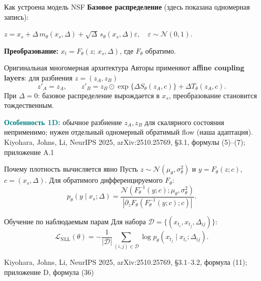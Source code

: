 \documentclass[10pt,aspectratio=169]{beamer}
\newcommand{\nsfsrc}[1]{\vfill{\tiny\color{graytext}Kiyohara, Johns, Li, NeurIPS 2025, arXiv:2510.25769, #1}}
\begin{document}
\begin{frame}{Как устроена модель NSF}
\vspace{0.06cm}
\textbf{Базовое распределение} (здесь показана одномерная запись):
\begin{center}
$\displaystyle z=x_s+\Delta\,m_\theta(x_s,\Delta)
+\sqrt{\Delta}\,s_\theta(x_s,\Delta)\varepsilon,
\quad\varepsilon\sim\mathcal N(0,1).$
\end{center}
\vspace{0.08cm}
\textbf{Преобразование:} $\displaystyle x_t=F_\theta(z;\,x_s,\Delta)$, где $F_\theta$ обратимо.
\vspace{0.12cm}
\begin{block}{Оригинальная многомерная архитектура}
Авторы применяют \textbf{affine coupling layers}: для разбиения $z=(z_A,z_B)$
\[
 z'_A=z_A,\qquad
 z'_B=z_B\odot\exp\{\Delta S_\theta(z_A,c)\}+\Delta T_\theta(z_A,c).
\]
При $\Delta=0$: базовое распределение вырождается в $x_s$, преобразование становится тождественным.
\end{block}
\vspace{0.01cm}
\small\textcolor{teal}{\bfseries Особенность 1D:} обычное разбиение $z_A,z_B$ для скалярного состояния неприменимо; нужен отдельный одномерный обратимый flow (наша адаптация).
\nsfsrc{\S 3.1, формулы (5)--(7); приложение A.1}
\end{frame}

\begin{frame}{Почему плотность вычисляется явно}
\vspace{0.11cm}
Пусть $z\sim\mathcal N(\mu_\theta,\sigma_\theta^2)$ и
$y=F_\theta(z;c)$, $c=(x_s,\Delta)$.
\vspace{0.14cm}
Для обратимого дифференцируемого $F_\theta$:
\[
\boxed{\quad p_\theta(y\mid x_s;\Delta)
=\frac{\mathcal N\!\left(F_\theta^{-1}(y;c);\mu_\theta,\sigma_\theta^2\right)}
{\left|\partial_zF_\theta\!\left(F_\theta^{-1}(y;c);c\right)\right|}.\quad}
\]
\vspace{0.08cm}
\begin{block}{Обучение по наблюдаемым парам}
Для набора $\mathcal D=\{(x_{t_i},x_{t_j},\Delta_{ij})\}$:
\[
\mathcal L_{\mathrm{NLL}}(\theta)=-\frac{1}{|\mathcal D|}
\sum_{(i,j)\in\mathcal D}\log p_\theta(x_{t_j}\mid x_{t_i};\Delta_{ij}).
\]
\end{block}
\nsfsrc{\S 3.1--3.2, формула (11); приложение D, формула (36)}
\end{frame}
\end{document}
